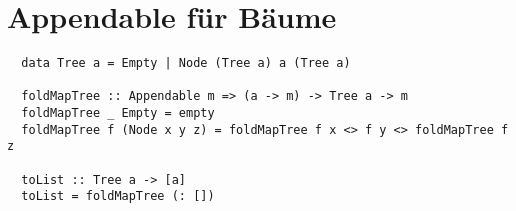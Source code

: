 \documentclass[a4paper]{article}
\begin{document}
\section{Appendable für Bäume}

\begin{lstlisting}
  data Tree a = Empty | Node (Tree a) a (Tree a)

  foldMapTree :: Appendable m => (a -> m) -> Tree a -> m
  foldMapTree _ Empty = empty
  foldMapTree f (Node x y z) = foldMapTree f x <> f y <> foldMapTree f z

  toList :: Tree a -> [a]
  toList = foldMapTree (: [])
\end{lstlisting}
\end{document}
